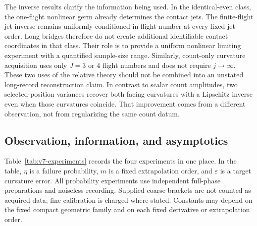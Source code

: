 The inverse results clarify the information being used. In the identical-even class, the one-flight nonlinear germ already determines the contact jets. The finite-flight jet inverse remains uniformly conditioned in flight number at every fixed jet order. Long bridges therefore do not create additional identifiable contact coordinates in that class. Their role is to provide a uniform nonlinear limiting experiment with a quantified sample-size range. Similarly, count-only curvature acquisition uses only $J=3$ or $4$ flight numbers and does not require $j\to\infty$. These two uses of the relative theory should not be combined into an unstated long-record reconstruction claim. In contrast to scalar count amplitudes, two selected-position variances recover both facing curvatures with a Lipschitz inverse even when those curvatures coincide. That improvement comes from a different observation, not from regularizing the same count datum.

\subsection{Observation, information, and asymptotics}
Table~\ref{tab:v7-experiments} records the four experiments in one place. In the table, $\eta$ is a failure probability, $m$ is a fixed extrapolation order, and $\varepsilon$ is a target curvature error. All probability experiments use independent full-phase preparations and noiseless recording. Supplied coarse brackets are not counted as acquired data; fine calibration is charged where stated. Constants may depend on the fixed compact geometric family and on each fixed derivative or extrapolation order.

